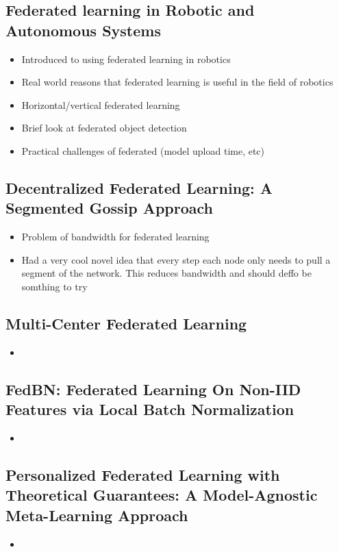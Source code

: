 \documentclass[12pt,a4paper,titlepage]{report}
\begin{document}
	\subsection {Federated learning in Robotic and Autonomous Systems \cite{fed_in_robotics}}
	\begin{itemize}
		\item Introduced to using federated learning in robotics
		\item Real world reasons that federated learning is useful in the field of robotics
		\item Horizontal/vertical federated learning
		\item Brief look at federated object detection
		\item Practical challenges of federated (model upload time, etc)
	\end{itemize}

	\subsection{Decentralized Federated Learning: A Segmented Gossip Approach \cite{gossip_learning}}
	\begin{itemize}
		\item Problem of bandwidth for federated learning
		\item Had a very cool novel idea that every step each node only needs to pull a segment of the network. This reduces bandwidth and should deffo be somthing to try
	\end{itemize}

	\subsection{Multi-Center Federated Learning \cite{multi_center_fed_learning}}
	\begin{itemize}
		\item 
	\end{itemize}
	
	\subsection{FedBN: Federated Learning On Non-IID Features via Local Batch Normalization \cite{fedbn}}
	\begin{itemize}
		\item 
	\end{itemize}

	\subsection{Personalized Federated Learning with Theoretical Guarantees: A Model-Agnostic Meta-Learning Approach \cite{model_agnostic_meta_learning}}
	\begin{itemize}
		\item 
	\end{itemize}
	
\end{document}
